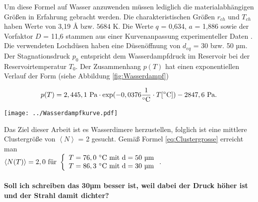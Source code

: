 Um diese Formel auf Wasser anzuwenden müssen lediglich die materialabhängigen Größen in Erfahrung gebracht werden. Die charakteristischen Größen $r_{ch}$ und $T_{ch}$ haben Werte von 3,19 \AA{} bzw. $5684$ K. Die Werte $q$ = 0,634, $a$ = 1,886 sowie der Vorfaktor $D$ = 11,6 stammen aus einer Kurvenanpassung experimenteller Daten \cite{bobbert2002}. Die verwendeten Lochdüsen haben eine Düsenöffnung von $d_{eq}$ = 30 bzw. 50 µm. Der Stagnationsdruck $p_0$ entspricht dem Wasserdampfdruck im Reservoir bei der Reservoirtemperatur $T_0$. Der Zusammenhang $p(T)$ hat einen exponentiellen Verlauf der Form (siehe Abbildung \ref{fig:Wasserdampf})

\begin{equation} \label{eq:Clustergrosse}
p(T) = 2,445,1\ \textmd{Pa} \cdot \textmd{exp}(-0,0376 \frac{1}{^{\circ} \textmd{C}} \cdot T [^{\circ} \textmd{C}]) - 2847,6\ \textmd{Pa} .
\end{equation}

\begin{center}
\begin{minipage}{\linewidth}
\centering
\texttt{[image: ../Wasserdampfkurve.pdf]}%
 \label{fig:Wasserdampf}
\end{minipage} 
\end{center}

Das Ziel dieser Arbeit ist es Wasserdimere herzustellen, folglich ist eine mittlere Clustergröße von $\left \langle N \right\rangle$ = 2 gesucht. Gemäß Formel \ref{eq:Clustergrosse} erreicht man \\ $\left \langle N(T) \right\rangle = 2,0 \textmd{ für }
\left\{ %
   \begin{array}{l}
   T = 76,0\ ^{\circ} \textmd{C} \textmd{ mit d}= 50 \textmd{ µm} \\ 
   T = 86,3\ ^{\circ} \textmd{C} \textmd{ mit d}= 30 \textmd{ µm}
   \end{array}
   \right. .$\\ \\
 \textbf{Soll ich schreiben das 30µm besser ist, weil dabei der Druck höher ist und der Strahl damit dichter?}